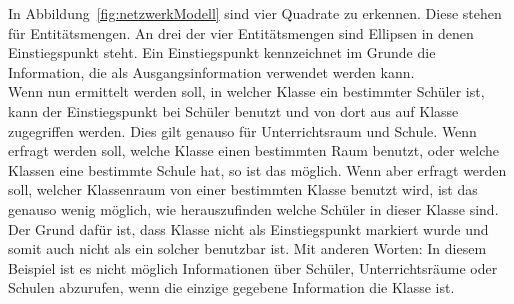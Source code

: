 \documentclass[a4paper, 12pt]{article}
\theoremstyle{plain}
\theoremstyle{definition}
\begin{document}
In Abbildung~\ref{fig:netzwerkModell} sind vier Quadrate zu erkennen. Diese stehen für Entitätsmengen. An drei der vier Entitätsmengen sind Ellipsen in denen Einstiegspunkt steht. Ein Einstiegspunkt kennzeichnet im Grunde die Information, die als Ausgangsinformation verwendet werden kann. \\
Wenn nun ermittelt werden soll, in welcher Klasse ein bestimmter Schüler ist, kann der Einstiegspunkt bei Schüler benutzt und von dort aus auf Klasse zugegriffen werden. Dies gilt genauso für Unterrichtsraum und Schule. Wenn erfragt werden soll, welche Klasse einen bestimmten Raum benutzt, oder welche Klassen eine bestimmte Schule hat, so ist das möglich. Wenn aber erfragt werden soll, welcher Klassenraum von einer bestimmten Klasse benutzt wird, ist das genauso wenig möglich, wie herauszufinden welche Schüler in dieser Klasse sind. Der Grund dafür ist, dass Klasse nicht als Einstiegspunkt markiert wurde und somit auch nicht als ein solcher benutzbar ist. Mit anderen Worten: In diesem Beispiel ist es nicht möglich Informationen über Schüler, Unterrichtsräume oder Schulen abzurufen, wenn die einzige gegebene Information die Klasse ist.
		
\end{document}

